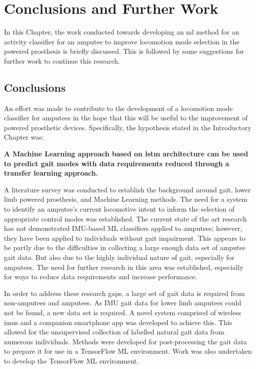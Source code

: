 \chapter{Conclusions and Further Work}
\label{chp:conclusions}
In this Chapter, the work conducted towards developing an \acrshort{ml} method for an activity classifier for an amputee to improve locomotion mode selection in the powered prosthesis is briefly discussed. This is followed by some suggestions for further work to continue this research.

\section{Conclusions} %
An effort was made to contribute to the development of a locomotion mode classifier for amputees in the hope that this will be useful to the improvement of powered prosthetic devices. Specifically, the hypothesis stated in the Introductory Chapter was:

\textbf{A Machine Learning approach based on \acrfull{lstm} architecture can be used to predict gait modes with data requirements reduced through a transfer learning approach.}

A literature survey was conducted to establish the background around gait, lower limb powered prosthesis, and Machine Learning methods. The need for a system to identify an amputee's current locomotive intent to inform the selection of appropriate control modes was established. The current state of the art research has not demonstrated IMU-based ML classifiers applied to amputees; however, they have been applied to individuals without gait impairment. This appears to be partly due to the difficulties in collecting a large enough data set of amputee gait data. But also due to the highly individual nature of gait, especially for amputees. The need for further research in this area was established, especially for ways to reduce data requirements and increase performance.

In order to address these research gaps, a large set of gait data is required from non-amputees and amputees. As IMU gait data for lower limb amputees could not be found, a new data set is required. A novel system comprised of wireless \acrshort{imu}s and a companion smartphone app was developed to achieve this. This allowed for the unsupervised collection of labelled natural gait data from numerous individuals. Methods were developed for post-processing the gait data to prepare it for use in a TensorFlow ML environment. Work was also undertaken to develop the TensorFlow ML environment.

